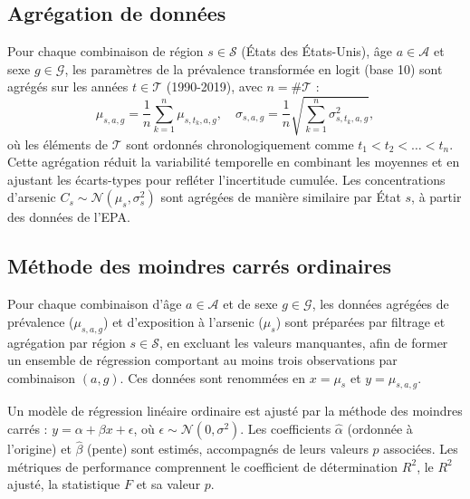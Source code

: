 \subsection{Agrégation de données}
Pour chaque combinaison de région $s \in \mathcal{S}$ (États des États-Unis), âge $a \in \mathcal{A}$ et sexe $g \in \mathcal{G}$, les paramètres de la prévalence transformée en logit (base 10) sont agrégés sur les années $t \in \mathcal{T}$ (1990-2019), avec $n = \#\mathcal{T}$ :
 \begin{equation}
\mu_{s,a,g} = \frac{1}{n} \sum_{k=1}^n \mu_{s,t_k,a,g}, \quad \sigma_{s,a,g} = \frac{1}{n} \sqrt{\sum_{k=1}^n \sigma_{s,t_k,a,g}^2},
 \end{equation}
où les éléments de $\mathcal{T}$ sont ordonnés chronologiquement comme $t_1 < t_2 < \dots < t_n$. Cette agrégation réduit la variabilité temporelle en combinant les moyennes et en ajustant les écarts-types pour refléter l'incertitude cumulée. Les concentrations d'arsenic $C_s \sim \mathcal{N}(\mu_s, \sigma_s^2)$ sont agrégées de manière similaire par État $s$, à partir des données de l'EPA.

\subsection{Méthode des moindres carrés ordinaires}
Pour chaque combinaison d'âge $a \in \mathcal{A}$ et de sexe $g \in \mathcal{G}$, les données agrégées de prévalence ($\mu_{s,a,g}$) et d'exposition à l'arsenic ($\mu_s$) sont préparées par filtrage et agrégation par région $s \in \mathcal{S}$, en excluant les valeurs manquantes, afin de former un ensemble de régression comportant au moins trois observations par combinaison $(a, g)$. Ces données sont renommées en $x = \mu_s$ et $y = \mu_{s,a,g}$.

Un modèle de régression linéaire ordinaire est ajusté par la méthode des moindres carrés : $y = \alpha + \beta x + \epsilon$, où $\epsilon \sim \mathcal{N}(0, \sigma^2)$. Les coefficients $\hat{\alpha}$ (ordonnée à l'origine) et $\hat{\beta}$ (pente) sont estimés, accompagnés de leurs valeurs $p$ associées. Les métriques de performance comprennent le coefficient de détermination $R^2$, le $R^2$ ajusté, la statistique $F$ et sa valeur $p$.


